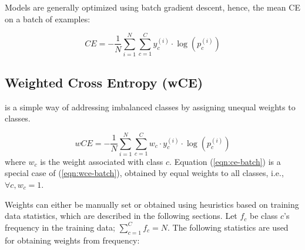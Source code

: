 Models are generally optimized using batch gradient descent, hence, the mean CE on a batch of examples:

\begin{equation} \label{eqn:ce-batch}
 CE = - \frac{1}{N} \sum^N_{i=1}\sum^C_{c=1} y^{(i)}_c\cdot \log(p^{(i)}_c)
\end{equation}

\subsection{Weighted Cross Entropy (wCE)} is a simple way of addressing imbalanced classes by assigning unequal weights to classes.

\begin{equation} \label{eqn:wce-batch}
 wCE = -\frac{1}{N} \sum^N_{i=1} \sum^C_{c=1} w_c \cdot y^{(i)}_c \cdot \log(p^{(i)}_c)
\end{equation}
where $w_c$ is the weight associated with class $c$.
Equation (\ref{eqn:ce-batch}) is a special case of (\ref{eqn:wce-batch}), obtained by  equal weights to all classes, i.e., $\forall c, w_c=1$.

Weights can either be manually set or obtained using heuristics based on training data statistics, which are described in the following sections.
Let $f_c$ be class $c$'s frequency in the training data; $\sum_{c=1}^C f_c = N$. 
The following statistics are used for obtaining weights from frequency:

